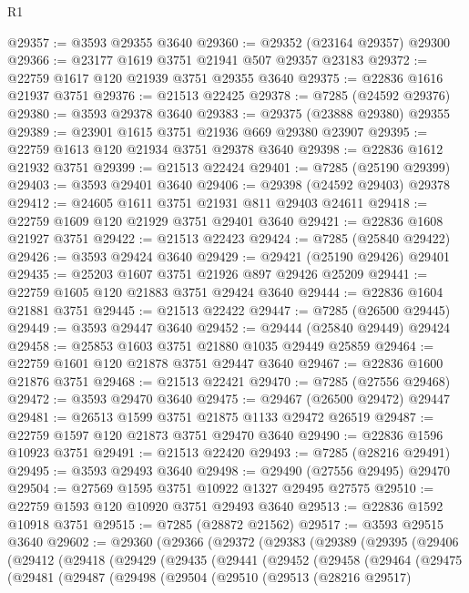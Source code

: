 \begin{lexlean}{R1}
\begin{coremodule}
@29357 := @3593 @29355 @3640
@29360 := @29352 (@23164 @29357) @29300
@29366 := @23177 @1619 @3751 @21941 @507 @29357 @23183
@29372 := @22759 @1617 @120 @21939 @3751 @29355 @3640
@29375 := @22836 @1616 @21937 @3751
@29376 := @21513 @22425
@29378 := @7285 (@24592 @29376)
@29380 := @3593 @29378 @3640
@29383 := @29375 (@23888 @29380) @29355
@29389 := @23901 @1615 @3751 @21936 @669 @29380 @23907
@29395 := @22759 @1613 @120 @21934 @3751 @29378 @3640
@29398 := @22836 @1612 @21932 @3751
@29399 := @21513 @22424
@29401 := @7285 (@25190 @29399)
@29403 := @3593 @29401 @3640
@29406 := @29398 (@24592 @29403) @29378
@29412 := @24605 @1611 @3751 @21931 @811 @29403 @24611
@29418 := @22759 @1609 @120 @21929 @3751 @29401 @3640
@29421 := @22836 @1608 @21927 @3751
@29422 := @21513 @22423
@29424 := @7285 (@25840 @29422)
@29426 := @3593 @29424 @3640
@29429 := @29421 (@25190 @29426) @29401
@29435 := @25203 @1607 @3751 @21926 @897 @29426 @25209
@29441 := @22759 @1605 @120 @21883 @3751 @29424 @3640
@29444 := @22836 @1604 @21881 @3751
@29445 := @21513 @22422
@29447 := @7285 (@26500 @29445)
@29449 := @3593 @29447 @3640
@29452 := @29444 (@25840 @29449) @29424
@29458 := @25853 @1603 @3751 @21880 @1035 @29449 @25859
@29464 := @22759 @1601 @120 @21878 @3751 @29447 @3640
@29467 := @22836 @1600 @21876 @3751
@29468 := @21513 @22421
@29470 := @7285 (@27556 @29468)
@29472 := @3593 @29470 @3640
@29475 := @29467 (@26500 @29472) @29447
@29481 := @26513 @1599 @3751 @21875 @1133 @29472 @26519
@29487 := @22759 @1597 @120 @21873 @3751 @29470 @3640
@29490 := @22836 @1596 @10923 @3751
@29491 := @21513 @22420
@29493 := @7285 (@28216 @29491)
@29495 := @3593 @29493 @3640
@29498 := @29490 (@27556 @29495) @29470
@29504 := @27569 @1595 @3751 @10922 @1327 @29495 @27575
@29510 := @22759 @1593 @120 @10920 @3751 @29493 @3640
@29513 := @22836 @1592 @10918 @3751
@29515 := @7285 (@28872 @21562)
@29517 := @3593 @29515 @3640
@29602 := @29360
    (@29366
      (@29372
        (@29383
          (@29389
            (@29395
              (@29406
                (@29412
                  (@29418
                    (@29429
                      (@29435
                        (@29441
                          (@29452
                            (@29458
                              (@29464
                                (@29475
                                  (@29481
                                    (@29487
                                      (@29498
                                        (@29504
                                          (@29510
                                            (@29513
                                              (@28216 @29517)

\end{coremodule}
\end{lexlean}

